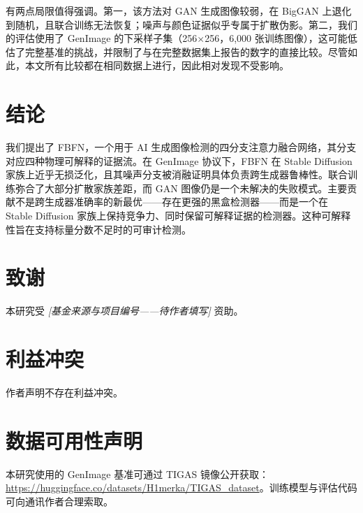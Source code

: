 \documentclass[11pt]{ctexart}
\begin{document}
有两点局限值得强调。第一，该方法对 GAN 生成图像较弱，在 BigGAN 上退化到随机，且联合训练无法恢复；噪声与颜色证据似乎专属于扩散伪影。第二，我们的评估使用了 GenImage 的下采样子集（256$\times$256，6,000 张训练图像），这可能低估了完整基准的挑战，并限制了与在完整数据集上报告的数字的直接比较。尽管如此，本文所有比较都在相同数据上进行，因此相对发现不受影响。

\section{结论}

我们提出了 FBFN，一个用于 AI 生成图像检测的四分支注意力融合网络，其分支对应四种物理可解释的证据流。在 GenImage 协议下，FBFN 在 Stable Diffusion 家族上近乎无损泛化，且其噪声分支被消融证明具体负责跨生成器鲁棒性。联合训练弥合了大部分扩散家族差距，而 GAN 图像仍是一个未解决的失败模式。主要贡献不是跨生成器准确率的新最优——存在更强的黑盒检测器——而是一个在 Stable Diffusion 家族上保持竞争力、同时保留可解释证据的检测器。这种可解释性旨在支持标量分数不足时的可审计检测。

\section*{致谢}

本研究受 \textit{[基金来源与项目编号——待作者填写]} 资助。

\section*{利益冲突}

作者声明不存在利益冲突。

\section*{数据可用性声明}

本研究使用的 GenImage 基准可通过 TIGAS 镜像公开获取：\url{https://huggingface.co/datasets/H1merka/TIGAS_dataset}。训练模型与评估代码可向通讯作者合理索取。
\end{document}
